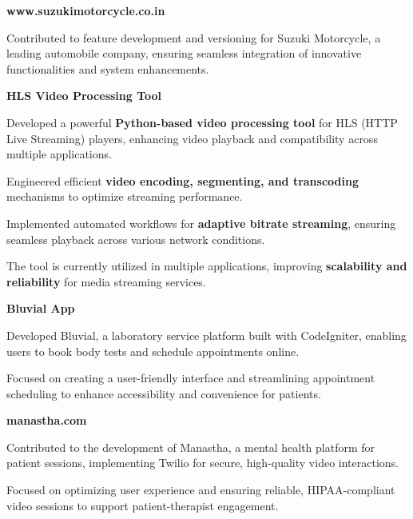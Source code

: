 \documentclass[letterpaper,10pt]{article}
\newcommand{\heading}[2]{
  \hspace{10pt}#1\hfill#2\\
}
\newcommand{\headingBf}[2]{
  \heading{\textbf{#1}}{\textbf{#2}}
}
\newenvironment{resume_list}{
  \vspace{-7pt}
  \begin{itemize}[itemsep=-2px, parsep=1pt, leftmargin=30pt]
}{
  \end{itemize}
}
\begin{document}
\headingBf{www.suzukimotorcycle.co.in}{}
\begin{resume_list}
    \item Contributed to feature development and versioning for Suzuki Motorcycle, a leading automobile company, ensuring seamless integration of innovative functionalities and system enhancements.
\end{resume_list}

\headingBf{HLS Video Processing Tool}{}
\begin{resume_list}
    \item Developed a powerful \textbf{Python-based video processing tool} for HLS (HTTP Live Streaming) players, enhancing video playback and compatibility across multiple applications.
    \item Engineered efficient \textbf{video encoding, segmenting, and transcoding} mechanisms to optimize streaming performance.
    \item Implemented automated workflows for \textbf{adaptive bitrate streaming}, ensuring seamless playback across various network conditions.
    \item The tool is currently utilized in multiple applications, improving \textbf{scalability and reliability} for media streaming services.
\end{resume_list}





\headingBf{Bluvial App}{}
\begin{resume_list}
    \item Developed Bluvial, a laboratory service platform built with CodeIgniter, enabling users to book body tests and schedule appointments online.
    \item Focused on creating a user-friendly interface and streamlining appointment scheduling to enhance accessibility and convenience for patients.
\end{resume_list}


\headingBf{manastha.com}{}
\begin{resume_list}
    \item Contributed to the development of Manastha, a mental health platform for patient sessions, implementing Twilio for secure, high-quality video interactions.
    \item Focused on optimizing user experience and ensuring reliable, HIPAA-compliant video sessions to support patient-therapist engagement.
\end{resume_list}
\end{document}
